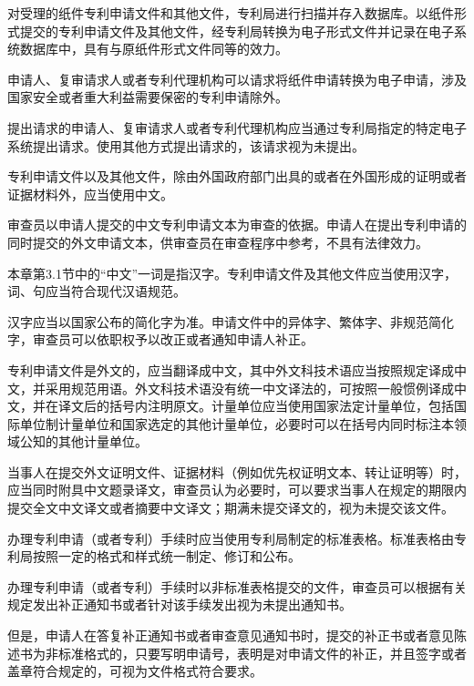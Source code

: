 对受理的纸件专利申请文件和其他文件，专利局进行扫描并存入数据库。以纸件形式提交的专利申请文件及其他文件，经专利局转换为电子形式文件并记录在电子系统数据库中，具有与原纸件形式文件同等的效力。

申请人、复审请求人或者专利代理机构可以请求将纸件申请转换为电子申请，涉及国家安全或者重大利益需要保密的专利申请除外。

提出请求的申请人、复审请求人或者专利代理机构应当通过专利局指定的特定电子系统提出请求。使用其他方式提出请求的，该请求视为未提出。

专利申请文件以及其他文件，除由外国政府部门出具的或者在外国形成的证明或者证据材料外，应当使用中文。

审查员以申请人提交的中文专利申请文本为审查的依据。申请人在提出专利申请的同时提交的外文申请文本，供审查员在审查程序中参考，不具有法律效力。

本章第3.1节中的“中文”一词是指汉字。专利申请文件及其他文件应当使用汉字，词、句应当符合现代汉语规范。

汉字应当以国家公布的简化字为准。申请文件中的异体字、繁体字、非规范简化字，审查员可以依职权予以改正或者通知申请人补正。

专利申请文件是外文的，应当翻译成中文，其中外文科技术语应当按照规定译成中文，并采用规范用语。外文科技术语没有统一中文译法的，可按照一般惯例译成中文，并在译文后的括号内注明原文。计量单位应当使用国家法定计量单位，包括国际单位制计量单位和国家选定的其他计量单位，必要时可以在括号内同时标注本领域公知的其他计量单位。

当事人在提交外文证明文件、证据材料（例如优先权证明文本、转让证明等）时，应当同时附具中文题录译文，审查员认为必要时，可以要求当事人在规定的期限内提交全文中文译文或者摘要中文译文；期满未提交译文的，视为未提交该文件。

办理专利申请（或者专利）手续时应当使用专利局制定的标准表格。标准表格由专利局按照一定的格式和样式统一制定、修订和公布。

办理专利申请（或者专利）手续时以非标准表格提交的文件，审查员可以根据有关规定发出补正通知书或者针对该手续发出视为未提出通知书。

但是，申请人在答复补正通知书或者审查意见通知书时，提交的补正书或者意见陈述书为非标准格式的，只要写明申请号，表明是对申请文件的补正，并且签字或者盖章符合规定的，可视为文件格式符合要求。

